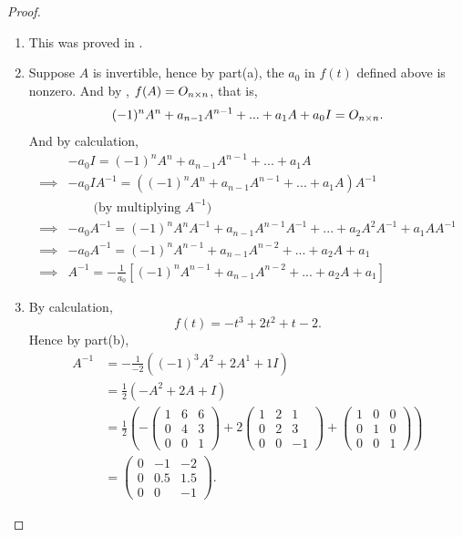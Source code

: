 \begin{proof} \ 

\begin{enumerate}
\item This was proved in .
\item Suppose \(A\) is invertible, hence by part(a), the \(a_0\) in \(f(t)\) defined above is nonzero.
And by , \(f(A) = O_{n \times n}\), that is,
\[
    (-1)^n A^n + a_{n - 1} A^{n - 1} + ... + a_1 A + a_0 I = O_{n \times n}.
\]
And by calculation,
\begin{align*}
             & -a_0 I = (-1)^n A^n + a_{n - 1} A^{n - 1} + ... + a_1 A \\
    \implies & -a_0 I A^{-1} = ((-1)^n A^n + a_{n - 1} A^{n - 1} + ... + a_1 A) A^{-1} \\
             & \quad \quad \text{(by multiplying \(A^{-1}\))} \\
    \implies & -a_0 A^{-1} = (-1)^n A^n A^{-1} + a_{n - 1} A^{n - 1} A^{-1} + ... + a_2 A^2 A^{-1} + a_1 A A^{-1} \\
    \implies & -a_0 A^{-1} = (-1)^n A^{n - 1} + a_{n - 1} A^{n - 2} + ... + a_2 A + a_1 \\
    \implies & A^{-1} = -\frac{1}{a_0} \left[ (-1)^n A^{n - 1} + a_{n - 1} A^{n - 2} + ... + a_2 A + a_1 \right]
\end{align*}

\item 
By calculation,
\[
    f(t) = -t^3 + 2t^2 + t - 2.
\]
Hence by part(b),
\begin{align*}
    A^{-1} & = -\frac{1}{-2} ( (-1)^3 A^2 + 2 A^1 + 1 I ) \\
           & = \frac{1}{2} (-A^2 + 2 A + I) \\
           & = \frac{1}{2} \left(
               - \begin{pmatrix} 1 & 6 & 6 \\ 0 & 4 & 3 \\ 0 & 0 & 1 \end{pmatrix}
               + 2 \begin{pmatrix} 1 & 2 & 1 \\ 0 & 2 & 3 \\ 0 & 0 & -1 \end{pmatrix}
               + \begin{pmatrix} 1 & 0 & 0 \\ 0 & 1 & 0 \\ 0 & 0 & 1 \end{pmatrix}
           \right) \\
           & = \begin{pmatrix}
               0 & -1 & -2 \\
               0 & 0.5 & 1.5 \\
               0 & 0 & -1
           \end{pmatrix}.
\end{align*}
\end{enumerate}
\end{proof}


